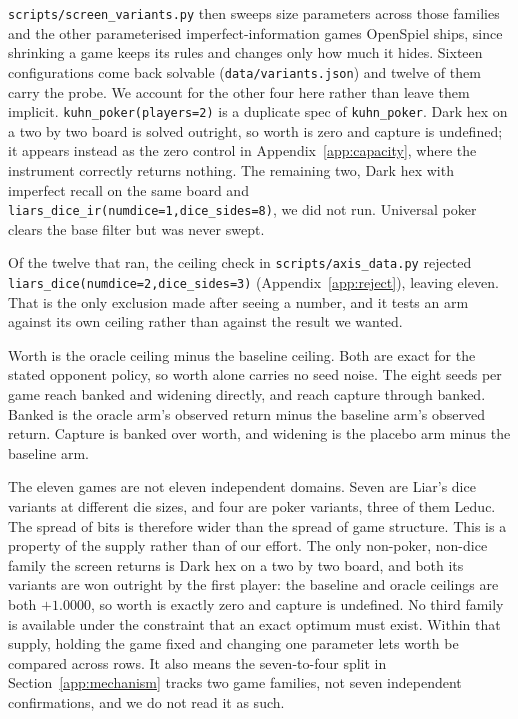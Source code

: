 \documentclass{article}
\begin{document}
\texttt{scripts/screen\_variants.py} then sweeps size parameters across those families and the other parameterised imperfect-information games OpenSpiel ships, since shrinking a game keeps its rules and changes only how much it hides. Sixteen configurations come back solvable (\texttt{data/variants.json}) and twelve of them carry the probe. We account for the other four here rather than leave them implicit. \texttt{kuhn\_poker(players=2)} is a duplicate spec of \texttt{kuhn\_poker}. Dark hex on a two by two board is solved outright, so worth is zero and capture is undefined; it appears instead as the zero control in Appendix~\ref{app:capacity}, where the instrument correctly returns nothing. The remaining two, Dark hex with imperfect recall on the same board and \texttt{liars\_dice\_ir(numdice=1,dice\_sides=8)}, we did not run. Universal poker clears the base filter but was never swept.

Of the twelve that ran, the ceiling check in \texttt{scripts/axis\_data.py} rejected \texttt{liars\_dice(numdice=2,dice\_sides=3)} (Appendix~\ref{app:reject}), leaving eleven. That is the only exclusion made after seeing a number, and it tests an arm against its own ceiling rather than against the result we wanted.

Worth is the oracle ceiling minus the baseline ceiling. Both are exact for the stated opponent policy, so worth alone carries no seed noise. The eight seeds per game reach banked and widening directly, and reach capture through banked. Banked is the oracle arm's observed return minus the baseline arm's observed return. Capture is banked over worth, and widening is the placebo arm minus the baseline arm.

The eleven games are not eleven independent domains. Seven are Liar's dice variants at different die sizes, and four are poker variants, three of them Leduc. The spread of bits is therefore wider than the spread of game structure. This is a property of the supply rather than of our effort. The only non-poker, non-dice family the screen returns is Dark hex on a two by two board, and both its variants are won outright by the first player: the baseline and oracle ceilings are both $+1.0000$, so worth is exactly zero and capture is undefined. No third family is available under the constraint that an exact optimum must exist. Within that supply, holding the game fixed and changing one parameter lets worth be compared across rows. It also means the seven-to-four split in Section~\ref{app:mechanism} tracks two game families, not seven independent confirmations, and we do not read it as such.
\end{document}
